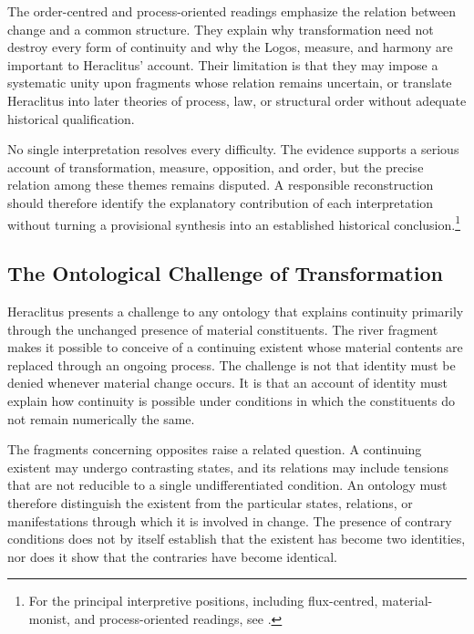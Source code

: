 The order-centred and process-oriented readings
emphasize the relation between change and a
common structure. They explain why transformation
need not destroy every form of continuity and
why the Logos, measure, and harmony are important
to Heraclitus' account. Their limitation is that
they may impose a systematic unity upon fragments
whose relation remains uncertain, or translate
Heraclitus into later theories of process, law,
or structural order without adequate historical
qualification.

\label{para:VS.B01.P01.C08.S03.SS07.P005}

No single interpretation resolves every difficulty.
The evidence supports a serious account of
transformation, measure, opposition, and order,
but the precise relation among these themes
remains disputed. A responsible reconstruction
should therefore identify the explanatory
contribution of each interpretation without
turning a provisional synthesis into an
established historical conclusion.\footnote{For
the principal interpretive positions, including
flux-centred, material-monist, and process-oriented
readings, see \cite{HeraclitusFragments,
KirkHeraclitus1954,GrahamTextsEarlyGreek2010,
GrahamHeraclitusSEP2023}.}


\subsection{The Ontological Challenge of Transformation}

\label{para:VS.B01.P01.C08.S03.SS08.P001}

Heraclitus presents a challenge to any ontology
that explains continuity primarily through the
unchanged presence of material constituents.
The river fragment makes it possible to conceive
of a continuing existent whose material contents
are replaced through an ongoing process. The
challenge is not that identity must be denied
whenever material change occurs. It is that
an account of identity must explain how continuity
is possible under conditions in which the
constituents do not remain numerically the same.

\label{para:VS.B01.P01.C08.S03.SS08.P002}

The fragments concerning opposites raise a related
question. A continuing existent may undergo
contrasting states, and its relations may include
tensions that are not reducible to a single
undifferentiated condition. An ontology must
therefore distinguish the existent from the
particular states, relations, or manifestations
through which it is involved in change. The
presence of contrary conditions does not by
itself establish that the existent has become
two identities, nor does it show that the
contraries have become identical.

